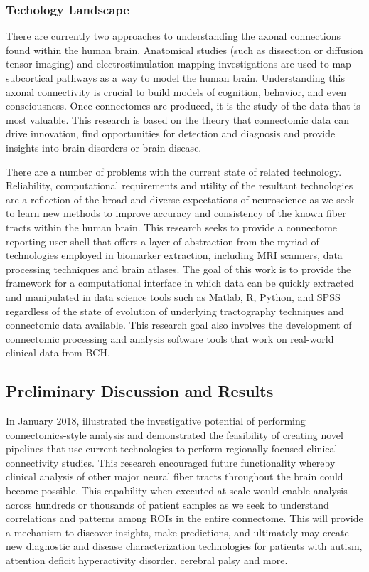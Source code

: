 \subsubsection {Techology Landscape}

There are currently two approaches to understanding the axonal connections found 
within the human brain.  Anatomical studies (such as dissection or diffusion 
tensor imaging) and electrostimulation mapping investigations are used to map 
subcortical pathways as a way to model the human brain.  Understanding this 
axonal connectivity is crucial to build models of cognition, behavior, and even 
consciousness\cite{daffau}. Once connectomes are produced, it is the study of 
the data that is most valuable. This research is based on the theory that 
connectomic data can drive innovation, find opportunities for detection and 
diagnosis and provide insights into brain disorders or brain disease.  

There are a number of problems with the current state of related technology.  
Reliability, computational requirements and utility of the resultant 
technologies are a reflection of the broad and diverse expectations of 
neuroscience as we seek to learn new methods to improve accuracy and consistency 
of the known fiber tracts within the human brain.   This research seeks to 
provide a connectome reporting user shell that offers a layer of abstraction 
from the myriad of technologies employed in biomarker extraction, including MRI 
scanners, data processing techniques and brain atlases.  The goal of this work 
is to provide the framework for a computational interface in which data can be 
quickly extracted and manipulated in data science tools such as Matlab, R, 
Python, and SPSS regardless of the state of evolution of underlying tractography 
techniques and connectomic data available. This research goal also involves the 
development of connectomic processing and analysis software tools that work on 
real-world clinical data from BCH.

\subsection {Preliminary Discussion and Results}

In January 2018, \cite {levman} illustrated the investigative potential of 
performing connectomics-style analysis and demonstrated the feasibility of 
creating novel pipelines that use current technologies to perform regionally 
focused clinical connectivity studies.  This research encouraged future 
functionality whereby clinical analysis of other major neural fiber tracts 
throughout the brain could become possible.  This capability when executed at 
scale would enable analysis across hundreds or thousands of patient samples as 
we seek to understand correlations and patterns among ROIs in the entire 
connectome.  This will provide a mechanism to discover insights, make 
predictions, and ultimately may create new diagnostic and disease 
characterization technologies for patients with autism, attention deficit 
hyperactivity disorder, cerebral palsy and more.

